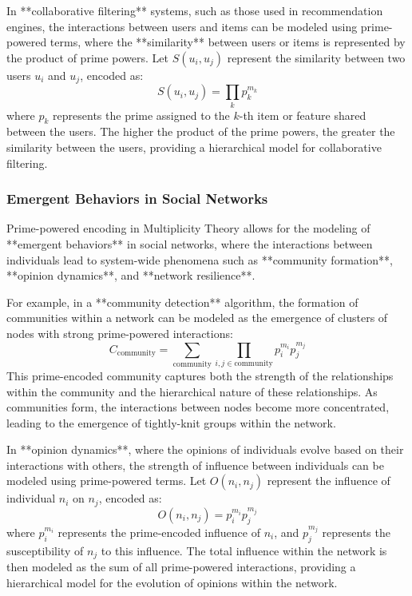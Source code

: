 \documentclass[12pt]{article}
\begin{document}
In **collaborative filtering** systems, such as those used in recommendation engines, the interactions between users and items can be modeled using prime-powered terms, where the **similarity** between users or items is represented by the product of prime powers. Let \( S(u_i, u_j) \) represent the similarity between two users \( u_i \) and \( u_j \), encoded as:
\[
S(u_i, u_j) = \prod_{k} p_k^{m_k}
\]
where \( p_k \) represents the prime assigned to the \( k \)-th item or feature shared between the users. The higher the product of the prime powers, the greater the similarity between the users, providing a hierarchical model for collaborative filtering.

\subsubsection{Emergent Behaviors in Social Networks}

Prime-powered encoding in Multiplicity Theory allows for the modeling of **emergent behaviors** in social networks, where the interactions between individuals lead to system-wide phenomena such as **community formation**, **opinion dynamics**, and **network resilience**.

For example, in a **community detection** algorithm, the formation of communities within a network can be modeled as the emergence of clusters of nodes with strong prime-powered interactions:
\[
C_{\text{community}} = \sum_{\text{community}} \prod_{i,j \in \text{community}} p_i^{m_i} p_j^{m_j}
\]
This prime-encoded community captures both the strength of the relationships within the community and the hierarchical nature of these relationships. As communities form, the interactions between nodes become more concentrated, leading to the emergence of tightly-knit groups within the network.

In **opinion dynamics**, where the opinions of individuals evolve based on their interactions with others, the strength of influence between individuals can be modeled using prime-powered terms. Let \( O(n_i, n_j) \) represent the influence of individual \( n_i \) on \( n_j \), encoded as:
\[
O(n_i, n_j) = p_i^{m_i} p_j^{m_j}
\]
where \( p_i^{m_i} \) represents the prime-encoded influence of \( n_i \), and \( p_j^{m_j} \) represents the susceptibility of \( n_j \) to this influence. The total influence within the network is then modeled as the sum of all prime-powered interactions, providing a hierarchical model for the evolution of opinions within the network.
\end{document}
